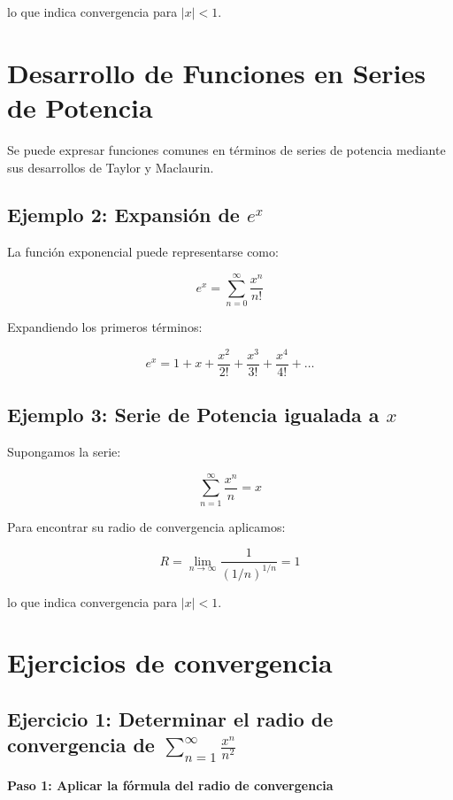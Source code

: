lo que indica convergencia para \( |x| < 1 \).

\section{Desarrollo de Funciones en Series de Potencia}
Se puede expresar funciones comunes en términos de series de potencia mediante sus desarrollos de Taylor y Maclaurin.

\subsection*{Ejemplo 2: Expansión de \( e^x \)}
La función exponencial puede representarse como:

\begin{equation}
e^x = \sum_{n=0}^{\infty} \frac{x^n}{n!}
\end{equation}

Expandiendo los primeros términos:

\begin{equation}
e^x = 1 + x + \frac{x^2}{2!} + \frac{x^3}{3!} + \frac{x^4}{4!} + \dots
\end{equation}

\subsection*{Ejemplo 3: Serie de Potencia igualada a \( x \)}
Supongamos la serie:

\begin{equation}
\sum_{n=1}^{\infty} \frac{x^n}{n} = x
\end{equation}

Para encontrar su radio de convergencia aplicamos:

\begin{equation}
R = \lim_{n \to \infty} \frac{1}{(1/n)^{1/n}} = 1
\end{equation}

lo que indica convergencia para \( |x| < 1 \).

\section{Ejercicios de convergencia}
\subsection*{Ejercicio 1: Determinar el radio de convergencia de \( \sum_{n=1}^{\infty} \frac{x^n}{n^2} \)}
\textbf{Paso 1: Aplicar la fórmula del radio de convergencia}

